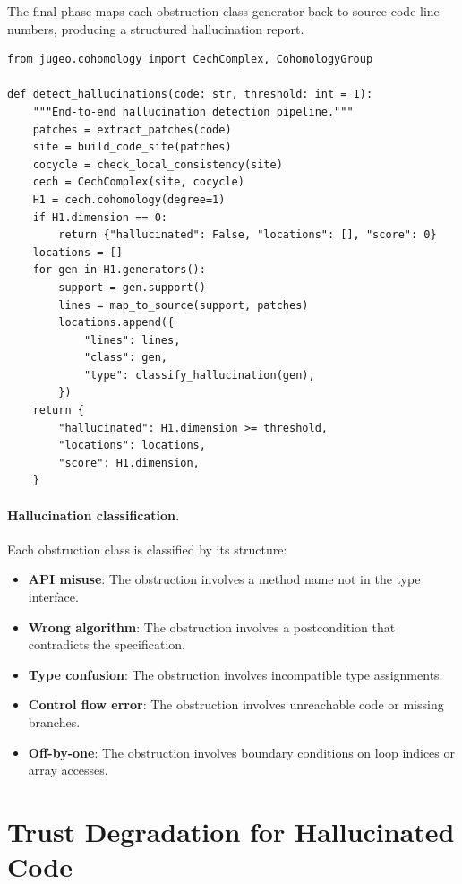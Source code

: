 \documentclass[11pt]{article}
\begin{document}
The final phase maps each obstruction class generator back to source
code line numbers, producing a structured hallucination report.

\begin{lstlisting}
from jugeo.cohomology import CechComplex, CohomologyGroup

def detect_hallucinations(code: str, threshold: int = 1):
    """End-to-end hallucination detection pipeline."""
    patches = extract_patches(code)
    site = build_code_site(patches)
    cocycle = check_local_consistency(site)
    cech = CechComplex(site, cocycle)
    H1 = cech.cohomology(degree=1)
    if H1.dimension == 0:
        return {"hallucinated": False, "locations": [], "score": 0}
    locations = []
    for gen in H1.generators():
        support = gen.support()
        lines = map_to_source(support, patches)
        locations.append({
            "lines": lines,
            "class": gen,
            "type": classify_hallucination(gen),
        })
    return {
        "hallucinated": H1.dimension >= threshold,
        "locations": locations,
        "score": H1.dimension,
    }
\end{lstlisting}

\paragraph{Hallucination classification.}
Each obstruction class is classified by its structure:
\begin{itemize}[noitemsep]
  \item \textbf{API misuse}: The obstruction involves a method name
        not in the type interface.
  \item \textbf{Wrong algorithm}: The obstruction involves a postcondition
        that contradicts the specification.
  \item \textbf{Type confusion}: The obstruction involves incompatible
        type assignments.
  \item \textbf{Control flow error}: The obstruction involves unreachable
        code or missing branches.
  \item \textbf{Off-by-one}: The obstruction involves boundary conditions
        on loop indices or array accesses.
\end{itemize}


\section{Trust Degradation for Hallucinated Code}\label{sec:trust-degradation}
\end{document}
